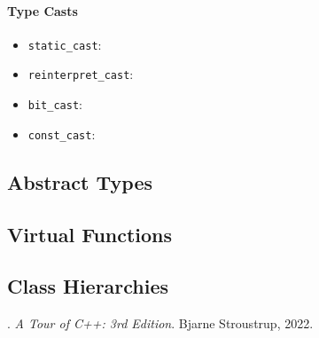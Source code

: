\documentclass[a4paper, 10pt]{article}
\begin{document}
\paragraph{Type Casts}
\begin{itemize}
	\item \verb!static_cast!:
	\item \verb!reinterpret_cast!:
	\item \verb!bit_cast!:
	\item \verb!const_cast!:
\end{itemize}
\subsection{Abstract Types}
\subsection{Virtual Functions}
\subsection{Class Hierarchies}

\begin{thebibliography}{9}
	.
	\textit{A Tour of C++: 3rd Edition}.
	Bjarne Stroustrup, 2022.

\end{thebibliography}
\end{document}
